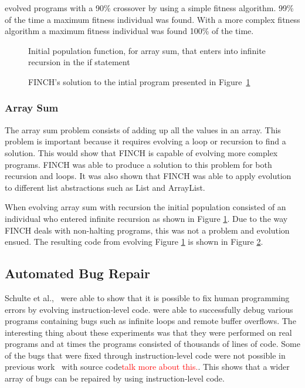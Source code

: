 \documentclass{sig-alternate}
\newcommand{\mycomment}[1]{\textcolor{red}{#1}}
\begin{document}
\cite{FINCH:2011} evolved programs with a 90\% crossover by using a simple fitness algorithm. 99\% of the time a maximum fitness individual was found. With a more complex fitness algorithm a maximum fitness individual was found 100\% of the time.


\begin{figure}
\centering
{}
\caption{Initial population function, for array sum, that enters into infinite recursion in the if statement}
\label{initial rec}
\end{figure}

\begin{figure}
\centering
{}
\caption{FINCH's solution to the intial program presented in Figure~\ref{initial rec}}
\label{final rec}
\end{figure}

\subsubsection{Array Sum}
The array sum problem consists of adding up all the values in an array. This problem is important because it requires evolving a loop or recursion to find a solution. This would show that FINCH is capable of evolving more complex programs. FINCH was able to produce a solution to this problem for both recursion and loops. It was also shown that FINCH was able to apply evolution to different list abstractions such as List and ArrayList.

When evolving array sum with recursion the initial population consisted of an individual who entered infinite recursion as shown in Figure \ref{initial rec}. Due to the way FINCH deals with non-halting programs, this was not a problem and evolution ensued. The resulting code from evolving Figure \ref{initial rec} is shown in Figure \ref{final rec}.


\subsection{Automated Bug Repair}

Schulte et al.,~\cite{Assembly:2010} were able to show that it is possible to fix human programming errors by evolving instruction-level code. \cite{Assembly:2010} were able to successfully debug various programs containing bugs such as infinite loops and remote buffer overflows. The interesting thing about these experiments was that they were performed on real programs and at times the programs consisted of thousands of lines of code. Some of the bugs that were fixed through instruction-level code were not possible in previous work~\cite{Forrest:2009} with source code\mycomment{talk more about this.}. This shows that a wider array of bugs can be repaired by using instruction-level code.
\end{document}
